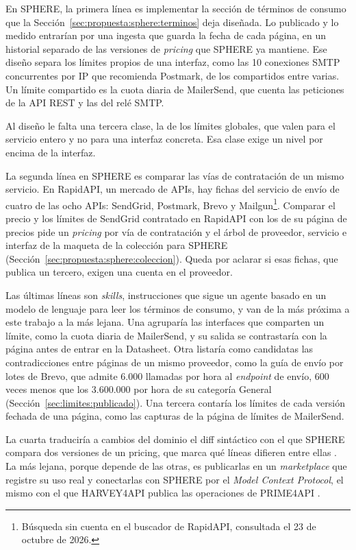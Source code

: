 En SPHERE, la primera línea es implementar la sección de términos de consumo que la Sección~\ref{sec:propuesta:sphere:terminos} deja diseñada.
Lo publicado y lo medido entrarían por una ingesta que guarda la fecha de cada página, en un historial separado de las versiones de \textit{pricing} que SPHERE ya mantiene.
Ese diseño separa los límites propios de una interfaz, como las 10 conexiones SMTP concurrentes por IP que recomienda Postmark, de los compartidos entre varias.
Un límite compartido es la cuota diaria de MailerSend, que cuenta las peticiones de la API REST y las del relé SMTP.

Al diseño le falta una tercera clase, la de los límites globales, que valen para el servicio entero y no para una interfaz concreta.
Esa clase exige un nivel por encima de la interfaz.

La segunda línea en SPHERE es comparar las vías de contratación de un mismo servicio.
En RapidAPI, un mercado de APIs, hay fichas del servicio de envío de cuatro de las ocho APIs: SendGrid, Postmark, Brevo y Mailgun\footnote{Búsqueda sin cuenta en el buscador de RapidAPI, consultada el 23 de octubre de 2026.}.
Comparar el precio y los límites de SendGrid contratado en RapidAPI con los de su página de precios pide un \textit{pricing} por vía de contratación y el árbol de proveedor, servicio e interfaz de la maqueta de la colección para SPHERE (Sección~\ref{sec:propuesta:sphere:coleccion}).
Queda por aclarar si esas fichas, que publica un tercero, exigen una cuenta en el proveedor.

Las últimas líneas son \textit{skills}, instrucciones que sigue un agente basado en un modelo de lenguaje para leer los términos de consumo, y van de la más próxima a este trabajo a la más lejana.
Una agruparía las interfaces que comparten un límite, como la cuota diaria de MailerSend, y su salida se contrastaría con la página antes de entrar en la Datasheet.
Otra listaría como candidatas las contradicciones entre páginas de un mismo proveedor, como la guía de envío por lotes de Brevo, que admite 6.000 llamadas por hora al \textit{endpoint} de envío, 600 veces menos que los 3.600.000 por hora de su categoría General (Sección~\ref{sec:limites:publicado}).
Una tercera contaría los límites de cada versión fechada de una página, como las capturas de la página de límites de MailerSend.

La cuarta traduciría a cambios del dominio el diff sintáctico con el que SPHERE compara dos versiones de un pricing, que marca qué líneas difieren entre ellas \citep{sphere}.
La más lejana, porque depende de las otras, es publicarlas en un \textit{marketplace} que registre su uso real y conectarlas con SPHERE por el \textit{Model Context Protocol}, el mismo con el que HARVEY4API publica las operaciones de PRIME4API \citep{mcp}.

